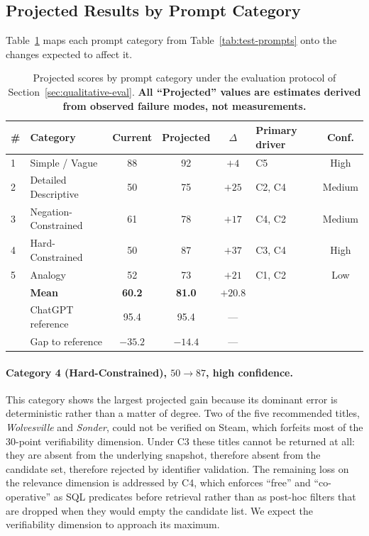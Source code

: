 \subsection{Projected Results by Prompt Category}
\label{sec:projected-results}

Table~\ref{tab:expected-gains} maps each prompt category from
Table~\ref{tab:test-prompts} onto the changes expected to affect it.

\begin{table}[h]
\centering
\caption{Projected scores by prompt category under the evaluation protocol of
Section~\ref{sec:qualitative-eval}. \textbf{All ``Projected'' values are
estimates derived from observed failure modes, not measurements.}}
\label{tab:expected-gains}
\small
\begin{tabular}{llccclc}
\hline
\textbf{\#} & \textbf{Category} & \textbf{Current} & \textbf{Projected} &
\textbf{$\Delta$} & \textbf{Primary driver} & \textbf{Conf.} \\
\hline
1 & Simple / Vague       & 88 & 92 & $+4$  & C5                & High   \\
2 & Detailed Descriptive & 50 & 75 & $+25$ & C2, C4            & Medium \\
3 & Negation-Constrained & 61 & 78 & $+17$ & C4, C2            & Medium \\
4 & Hard-Constrained     & 50 & 87 & $+37$ & C3, C4            & High   \\
5 & Analogy              & 52 & 73 & $+21$ & C1, C2            & Low    \\
\hline
  & \textbf{Mean}        & \textbf{60.2} & \textbf{81.0} & $\mathbf{+20.8}$ & & \\
\hline
  & ChatGPT reference    & 95.4 & 95.4 & --- & & \\
  & Gap to reference     & $-35.2$ & $-14.4$ & --- & & \\
\hline
\end{tabular}
\end{table}

\paragraph{Category 4 (Hard-Constrained), $50 \rightarrow 87$, high confidence.}
This category shows the largest projected gain because its dominant error is
deterministic rather than a matter of degree. Two of the five recommended
titles, \emph{Wolvesville} and \emph{Sonder}, could not be verified on Steam,
which forfeits most of the 30-point verifiability dimension. Under C3 these
titles cannot be returned at all: they are absent from the underlying snapshot,
therefore absent from the candidate set, therefore rejected by identifier
validation. The remaining loss on the relevance dimension is addressed by C4,
which enforces ``free'' and ``co-operative'' as SQL predicates before retrieval
rather than as post-hoc filters that are dropped when they would empty the
candidate list. We expect the verifiability dimension to approach its maximum.

